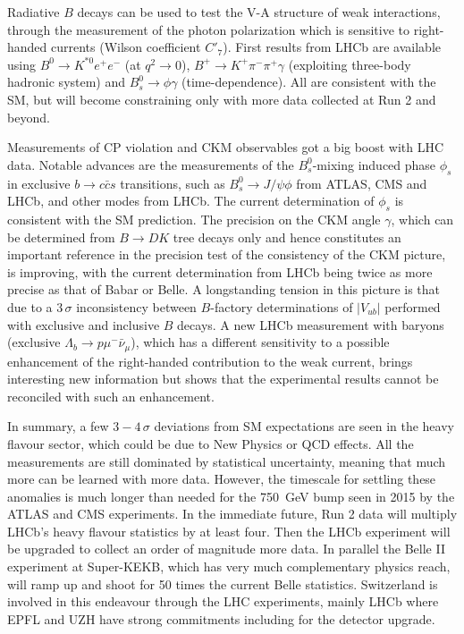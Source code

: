 \medskip
\noindent Radiative $B$ decays can be used to test the V-A structure of weak interactions, through the measurement of the photon
polarization which is sensitive to right-handed currents (Wilson coefficient $C'_7$). First results from LHCb are available
using $B^0 \to K^{*0}e^+e^-$ (at $q^2\to 0$), $B^+ \to K^+\pi^-\pi^+\gamma$ (exploiting three-body hadronic system) and 
$B^0_s \to \phi\gamma$ (time-dependence). All are consistent with the SM, but will become constraining only 
with more data collected at Run 2 and beyond.
\medskip

\noindent Measurements of CP violation and CKM observables got a big boost with LHC data. Notable advances are the measurements of the $B^0_s$-mixing induced phase $\phi_s$ in exclusive $b \to c \bar{c}s$ transitions, such as $B^0_s \to J/\psi \phi$ from ATLAS, CMS and LHCb, and other modes from LHCb. The current determination of $\phi_s$ is consistent with the SM prediction. The precision on the CKM angle $\gamma$, which can be determined from $B\to DK$ tree decays only and hence constitutes an important reference in the precision test of the consistency of the CKM picture, is improving, with the current determination from LHCb being twice as more precise as that of Babar or Belle.  A longstanding tension in this picture is that due to a $3\,\sigma$ inconsistency between $B$-factory determinations 
of $|V_{ub}|$ performed with exclusive and  inclusive $B$ decays. A new LHCb measurement with baryons (exclusive $\Lambda_b \to p \mu^-\bar{\nu}_\mu$), which has a different sensitivity to a possible enhancement of the right-handed contribution to the weak current, brings interesting new information but shows that the experimental results 
cannot be reconciled with such an enhancement.

\medskip

\noindent In summary, a few $3-4\,\sigma$ deviations from SM expectations are seen in the heavy flavour sector, which could
be due to New Physics or QCD effects. All the measurements are still dominated by statistical uncertainty, meaning that
much more can be learned with more data. However, the timescale for settling these anomalies is much longer than
needed for the 750~GeV bump seen in 2015 by the ATLAS and CMS experiments. In the immediate future, Run 2 data
will multiply LHCb's heavy flavour statistics by at least four. 
Then the LHCb experiment will be upgraded to collect an order of magnitude more data. 
In parallel the  Belle II experiment at Super-KEKB, which has very much complementary physics reach, 
will ramp up and shoot for 50 times the current Belle statistics.  Switzerland is involved in this endeavour through the LHC experiments, mainly LHCb where EPFL and UZH have strong commitments including for the detector upgrade.